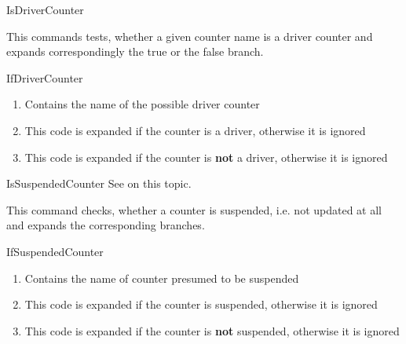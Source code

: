 \documentclass[12pt,paper=a4]{ltxdoc}
\begin{document}
\begin{docCommand}{IsDriverCounter}{}%

This commands tests, whether a given counter name is a driver counter and expands correspondingly the true or the false branch.

\begin{docCommandArgs}{IfDriverCounter}%

\begin{enumerate}[label={\textcolor{blue}{\#\arabic*}}]
\item {}%

  Contains the name of the possible driver counter

\item {}

  This code is expanded if the counter is a driver, otherwise it is ignored

\item {}

  This code is expanded if the counter is \textbf{not} a  driver, otherwise it is ignored
\end{enumerate}
\end{docCommandArgs}


\begin{dispExample}
\end{dispExample}

\end{docCommand}%

\begin{docCommand}{IsSuspendedCounter}{}
See  on this topic. 

This command checks, whether a counter is suspended, i.e. not updated at all and expands the corresponding branches.

\begin{docCommandArgs}{IfSuspendedCounter}%

\begin{enumerate}[label={\textcolor{blue}{\#\arabic*}}]
\item {}%

  Contains the name of counter presumed to be suspended

\item {}

  This code is expanded if the counter is suspended, otherwise it is ignored

\item {}

  This code is expanded if the counter is \textbf{not} suspended, otherwise it is ignored

\end{enumerate}
\end{docCommandArgs}



\end{docCommand}
\end{document}
